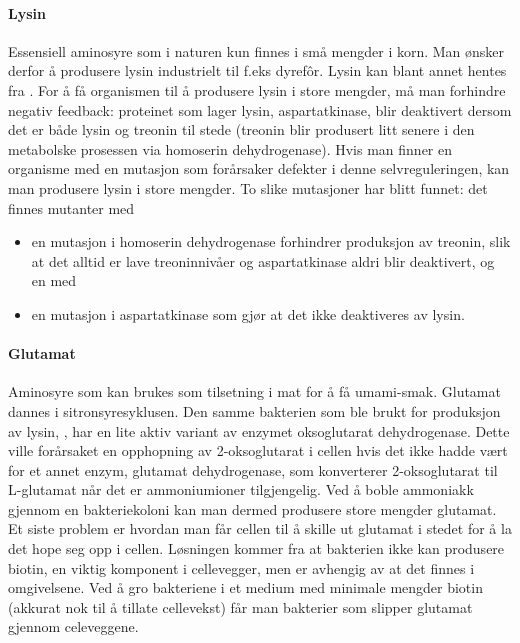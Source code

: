 \paragraph{Lysin} Essensiell aminosyre som i naturen kun finnes i små mengder i korn. Man ønsker derfor å produsere lysin industrielt til f.eks dyrefôr. Lysin kan blant annet hentes fra . For å få organismen til å produsere lysin i store mengder, må man forhindre negativ feedback: proteinet som lager lysin, aspartatkinase, blir deaktivert dersom det er både lysin og treonin til stede (treonin blir produsert litt senere i den metabolske prosessen via homoserin dehydrogenase). Hvis man finner en organisme med en mutasjon som forårsaker defekter i denne selvreguleringen, kan man produsere lysin i store mengder. To slike mutasjoner har blitt funnet: det finnes mutanter med
\begin{itemize}[nolistsep,noitemsep]
	\item en mutasjon i homoserin dehydrogenase forhindrer produksjon av treonin, slik at det alltid er lave treoninnivåer og aspartatkinase aldri blir deaktivert, og en med
	\item en mutasjon i aspartatkinase som gjør at det ikke deaktiveres av lysin. 
\end{itemize}

\paragraph{Glutamat} Aminosyre som kan brukes som tilsetning i mat for å få umami-smak. Glutamat dannes i sitronsyresyklusen. Den samme bakterien som ble brukt for produksjon av lysin, , har en lite aktiv variant av enzymet oksoglutarat dehydrogenase. Dette ville forårsaket en opphopning av 2-oksoglutarat i cellen hvis det ikke hadde vært for et annet enzym, glutamat dehydrogenase, som konverterer 2-oksoglutarat til L-glutamat når det er ammoniumioner tilgjengelig. Ved å boble ammoniakk gjennom en bakteriekoloni kan man dermed produsere store mengder glutamat. Et siste problem er hvordan man får cellen til å skille ut glutamat i stedet for å la det hope seg opp i cellen. Løsningen kommer fra at bakterien ikke kan produsere biotin, en viktig komponent i cellevegger, men er avhengig av at det finnes i omgivelsene. Ved å gro bakteriene i et medium med minimale mengder biotin (akkurat nok til å tillate cellevekst) får man bakterier som slipper glutamat gjennom celeveggene. 

